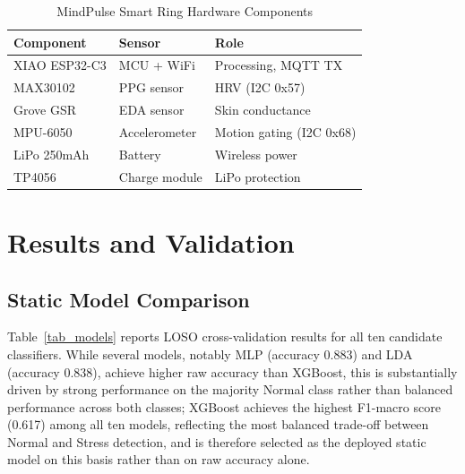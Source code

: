 \documentclass[conference]{IEEEtran}
\begin{document}
\begin{table}[htbp]
\caption{MindPulse Smart Ring Hardware Components}
\begin{center}
\begin{tabular}{|l|l|l|}
\hline
\textbf{Component} &
\textbf{Sensor} &
\textbf{Role} \\
\hline
XIAO ESP32-C3 & MCU + WiFi &
Processing, MQTT TX \\
MAX30102 & PPG sensor &
HRV (I2C 0x57) \\
Grove GSR & EDA sensor &
Skin conductance \\
MPU-6050 & Accelerometer &
Motion gating (I2C 0x68) \\
LiPo 250mAh & Battery &
Wireless power \\
TP4056 & Charge module &
LiPo protection \\
\hline
\end{tabular}
\label{tab_hardware}
\end{center}
\end{table}

\section{Results and Validation}

\subsection{Static Model Comparison}
\label{sec_results_obj1}
Table~\ref{tab_models} reports LOSO cross-validation results
for all ten candidate classifiers. While several models,
notably MLP (accuracy 0.883) and LDA (accuracy 0.838), achieve
higher raw accuracy than XGBoost, this is substantially driven
by strong performance on the majority Normal class rather than
balanced performance across both classes; XGBoost achieves the
highest F1-macro score (0.617) among all ten models, reflecting
the most balanced trade-off between Normal and Stress
detection, and is therefore selected as the deployed static
model on this basis rather than on raw accuracy alone.
\end{document}
